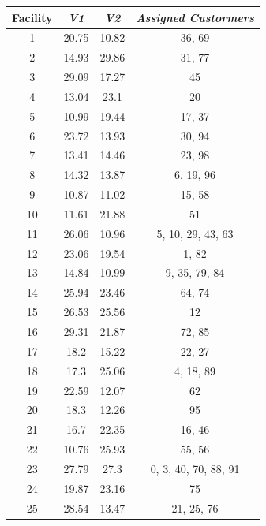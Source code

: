 \documentclass[12pt]{article}
\begin{document}
\begin{table}[h]
    
    \begin{minipage}{.49\linewidth}
    \begin{tabular}{|c|ccc|}
    \hline
    Facility & \textit{V1} & \textit{V2} & \textit{Assigned Custormers} \\
    \hline
1 & 20.75 & 10.82 &  36, 69          \\
2 & 14.93 & 29.86 &  31, 77          \\
3 & 29.09 & 17.27 &  45            \\
4 & 13.04 & 23.1 &  20            \\
5 & 10.99 & 19.44 &  17, 37          \\
6 & 23.72 & 13.93 &  30, 94          \\
7 & 13.41 & 14.46 &  23, 98          \\
8 & 14.32 & 13.87 &   6, 19, 96        \\
9 & 10.87 & 11.02 &  15, 58          \\
10 & 11.61 & 21.88 &  51            \\
11 & 26.06 & 10.96 &   5, 10, 29, 43, 63    \\
12 & 23.06 & 19.54 &   1, 82          \\
13 & 14.84 & 10.99 &   9, 35, 79, 84      \\
14 & 25.94 & 23.46 &  64, 74          \\
15 & 26.53 & 25.56 &  12            \\
16 & 29.31 & 21.87 &  72, 85          \\
17 & 18.2 & 15.22 &  22, 27          \\
18 & 17.3 & 25.06 &   4, 18, 89        \\
19 & 22.59 & 12.07 &  62            \\
20 & 18.3 & 12.26 &  95            \\
21 & 16.7 & 22.35 &  16,  46          \\
22 & 10.76 & 25.93 &  55,  56          \\
23 & 27.79 & 27.3 &   0,   3, 40, 70, 88, 91  \\
24 & 19.87 & 23.16 &  75            \\
25 & 28.54 & 13.47 &  21,  25, 76        \\
        \hline
    \end{tabular}
    \end{minipage}
     \begin{minipage}{.49\linewidth}

\end{minipage}
\end{table}
\end{document}
